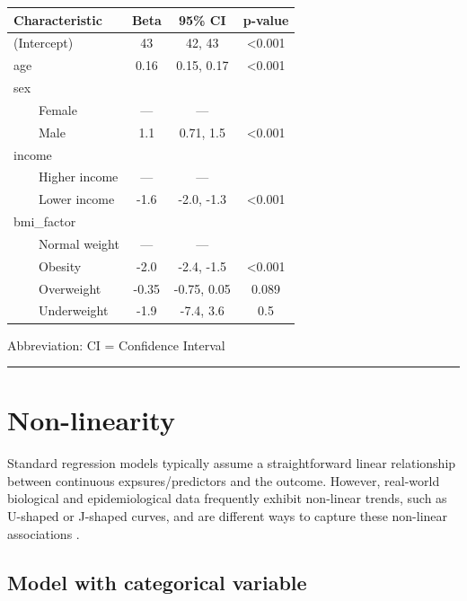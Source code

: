 \documentclass[
]{book}
\begin{document}
\begin{table}[t]
\fontsize{12.0pt}{14.0pt}\selectfont
\begin{tabular*}{\linewidth}{@{\extracolsep{\fill}}lccc}
\toprule
\textbf{Characteristic} & \textbf{Beta} & \textbf{95\% CI} & \textbf{p-value} \\ 
\midrule\addlinespace[2.5pt]
(Intercept) & 43 & 42, 43 & <0.001 \\ 
age & 0.16 & 0.15, 0.17 & <0.001 \\ 
sex &  &  &  \\ 
    Female & — & — &  \\ 
    Male & 1.1 & 0.71, 1.5 & <0.001 \\ 
income &  &  &  \\ 
    Higher income & — & — &  \\ 
    Lower income & -1.6 & -2.0, -1.3 & <0.001 \\ 
bmi\_factor &  &  &  \\ 
    Normal weight & — & — &  \\ 
    Obesity & -2.0 & -2.4, -1.5 & <0.001 \\ 
    Overweight & -0.35 & -0.75, 0.05 & 0.089 \\ 
    Underweight & -1.9 & -7.4, 3.6 & 0.5 \\ 
\bottomrule
\end{tabular*}
\begin{minipage}{\linewidth}
\vspace{.05em}
Abbreviation: CI = Confidence Interval\\
\end{minipage}
\end{table}

\begin{center}\rule{0.5\linewidth}{0.5pt}\end{center}

\section{Non-linearity}\label{non-linearity}

Standard regression models typically assume a straightforward linear relationship between continuous expsures/predictors and the outcome. However, real-world biological and epidemiological data frequently exhibit non-linear trends, such as U-shaped or J-shaped curves, and are different ways to capture these non-linear associations \citep{ho2023non}.

\subsection{Model with categorical variable}\label{model-with-categorical-variable}
\end{document}
